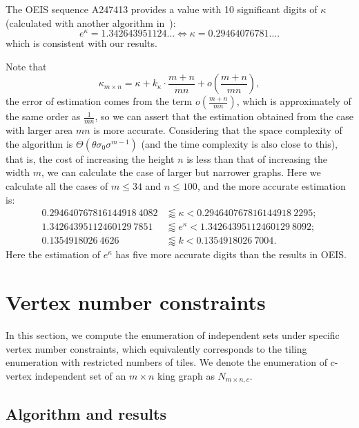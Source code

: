 \documentclass[11pt]{article}
\begin{document}
    The OEIS sequence A247413 provides a value with 10 significant digits of $\kappa$ (calculated with another algorithm in~\cite{const}):
    \begin{equation}\label{eq:kappa}
        e^\kappa = 1.342643951124\ldots \Leftrightarrow \kappa =0.29464076781\ldots.
    \end{equation}
    which is consistent with our results.

    Note that
    \[
        \kappa_{m\times n} =\kappa+k_{\kappa}\cdot\frac{m+n}{mn} +o\left(\frac{m+n}{mn}\right),
    \]
    the error of estimation comes from the term $o\left(\frac{m+n}{mn}\right)$, which is approximately of the same order as $\frac{1}{mn}$, so we can assert that the estimation obtained from the case with larger area $mn$ is more accurate.
    Considering that the space complexity of the algorithm is $\Theta(\theta\sigma_0\sigma^{m-1})$ (and the time complexity is also close to this), that is, the cost of increasing the height $n$ is less than that of increasing the width $m$, we can calculate the case of larger but narrower graphs.
    Here we calculate all the cases of $m\leq34$ and $n\leq100$, and the more accurate estimation is:
    \begin{align*}
        0.294640767816144918~4082&\lessapprox \kappa  <0.294640767816144918~2295;\\
        1.34264395112460129~7851 &\lessapprox e^\kappa<1.34264395112460129~8092 ;\\
        0.1354918026~4626        &\lessapprox k       < 0.1354918026~7004.
    \end{align*}
    Here the estimation of $e^\kappa$ has five more accurate digits than the results in OEIS.

    \section{Vertex number constraints}

    In this section, we compute the enumeration of independent sets under specific vertex number constraints, which equivalently corresponds to the tiling enumeration with restricted numbers of tiles.
    We denote the enumeration of $c$-vertex independent set of an $m\times n$ king graph as $N_{m\times n,c}$.

    \subsection{Algorithm and results}
\end{document}

